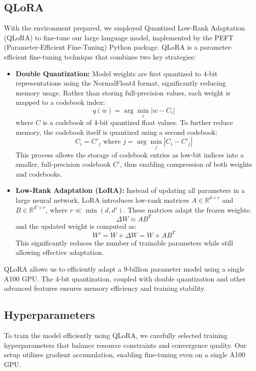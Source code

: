\documentclass[fleqn,moreauthors,10pt]{ds_report}
\begin{document}
\subsection*{QLoRA}
With the environment prepared, we employed Quantized Low-Rank Adaptation (QLoRA) to fine-tune our large language model, implemented by the PEFT (Parameter-Efficient Fine-Tuning) Python package. QLoRA is a parameter-efficient fine-tuning technique that combines two key strategies:

\begin{itemize}
  \item \textbf{Double Quantization:} Model weights are first quantized to 4-bit representations using the NormalFloat4 format, significantly reducing memory usage. Rather than storing full-precision values, each weight is mapped to a codebook index:
  \[
  q(w) = \arg\min_{i} |w - C_i|
  \]
  where \( C \) is a codebook of 4-bit quantized float values. To further reduce memory, the codebook itself is quantized using a second codebook:
  \[
  C_i = C'_j \text{ where } j = \arg\min_{j} |C_i - C'_j|
  \]
  This process allows the storage of codebook entries as low-bit indices into a smaller, full-precision codebook \( C' \), thus enabling compression of both weights and codebooks.

  \item \textbf{Low-Rank Adaptation (LoRA):} Instead of updating all parameters in a large neural network, LoRA introduces low-rank matrices \( A \in \mathbb{R}^{d \times r} \) and \( B \in \mathbb{R}^{d' \times r} \), where \( r \ll \min(d, d') \). These matrices adapt the frozen weights:
  \[
  \Delta W \approx A B^T
  \]
  and the updated weight is computed as:
  \[
  W' = W + \Delta W = W + A B^T
  \]
  This significantly reduces the number of trainable parameters while still allowing effective adaptation.
\end{itemize}

QLoRA allows us to efficiently adapt a 9-billion parameter model using a single A100 GPU. The 4-bit quantization, coupled with double quantization and other advanced features ensures memory efficiency and training stability.

\subsection*{Hyperparameters}

To train the model efficiently using QLoRA, we carefully selected training hyperparameters that balance resource constraints and convergence quality. Our setup utilizes gradient accumulation, enabling fine-tuning even on a single A100 GPU.
\end{document}
